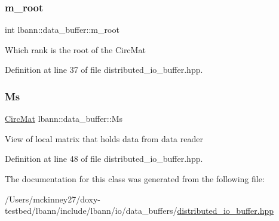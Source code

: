\subsubsection{\texorpdfstring{m\+\_\+root}{m\_root}}
{\footnotesize\ttfamily int lbann\+::data\+\_\+buffer\+::m\+\_\+root}

Which rank is the root of the Circ\+Mat 

Definition at line 37 of file distributed\+\_\+io\+\_\+buffer.\+hpp.

\mbox{\label{classlbann_1_1data__buffer_a9c9f68cda527896bc45762ddac7c2e2a}} 
\subsubsection{\texorpdfstring{Ms}{Ms}}
{\footnotesize\ttfamily \hyperlink{base_8hpp_a48abd140bc807a8ac1381efd1bfeb375}{Circ\+Mat} lbann\+::data\+\_\+buffer\+::\+Ms}

View of local matrix that holds data from data reader 

Definition at line 48 of file distributed\+\_\+io\+\_\+buffer.\+hpp.



The documentation for this class was generated from the following file\+:\begin{DoxyCompactItemize}
\item 
/\+Users/mckinney27/doxy-\/testbed/lbann/include/lbann/io/data\+\_\+buffers/\hyperlink{distributed__io__buffer_8hpp}{distributed\+\_\+io\+\_\+buffer.\+hpp}\end{DoxyCompactItemize}
